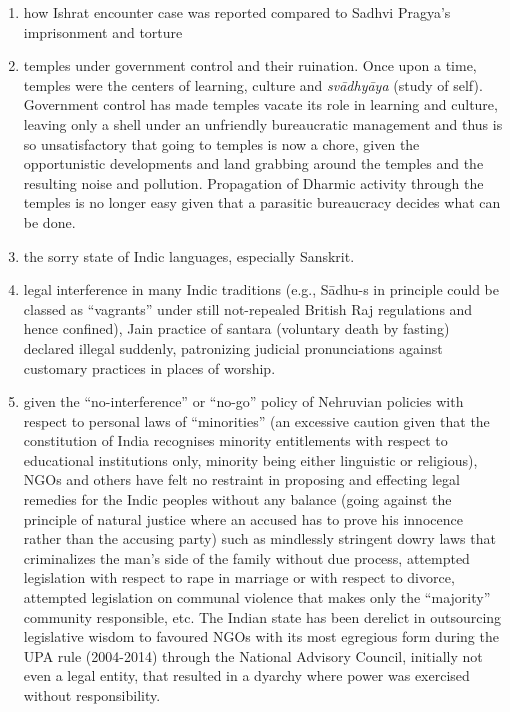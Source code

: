 {
\begin{enumerate}
\item how Ishrat encounter case was reported compared to Sadhvi Pragya’s imprisonment and torture
\item temples under government control and their ruination. Once upon a time, temples were the centers of learning, culture and {\sl svādhyāya} (study of self). Government control has made temples vacate its role in learning and culture, leaving only a shell under an unfriendly  bureaucratic management and thus is so unsatisfactory that going to temples is now a chore, given the opportunistic developments and land grabbing around the temples and the resulting noise and pollution. Propagation of Dharmic activity through the temples is no longer easy given that a parasitic bureaucracy decides what can be done.
\item the sorry state of Indic languages, especially Sanskrit.
\item legal interference in many Indic traditions (e.g., Sādhu-s in principle could be classed as “vagrants” under still not-repealed British Raj regulations and hence confined), Jain practice of santara (voluntary death by fasting) declared illegal suddenly, patronizing judicial pronunciations against customary practices in places of worship.
\item given the “no-interference” or “no-go” policy of Nehruvian policies with respect to personal laws of “minorities” (an excessive caution given that the constitution of India recognises minority entitlements with respect to educational institutions only, minority being either linguistic or religious), NGOs and others have felt no restraint in proposing and effecting legal remedies for the Indic peoples without any balance (going against the principle of natural justice where an accused has to prove his innocence rather than the accusing party) such as mindlessly stringent dowry laws that criminalizes the man’s side of the family without due process, attempted legislation with respect to rape in marriage or with respect to divorce, attempted legislation on communal violence that makes only the “majority” community responsible, etc. The Indian state has been derelict in outsourcing legislative wisdom to favoured NGOs with its most egregious form during the UPA rule (2004-2014) through the National Advisory Council, initially not even a legal entity, that resulted in a dyarchy where power was exercised without responsibility.
\end{enumerate}}


